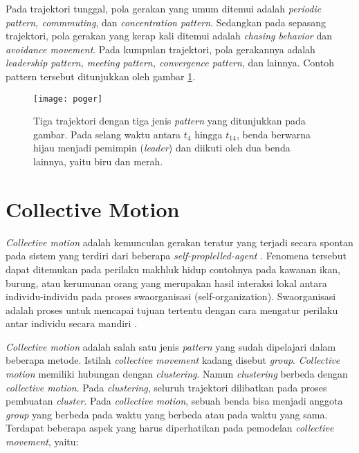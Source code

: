 \par Pada trajektori tunggal, pola gerakan yang umum ditemui adalah \textit{periodic pattern, commmuting}, dan \textit{concentration pattern}. Sedangkan pada sepasang trajektori, pola gerakan yang kerap kali ditemui adalah \textit{chasing behavior} dan \textit{avoidance movement}. Pada kumpulan trajektori, pola gerakannya adalah \textit{leadership pattern, meeting pattern, convergence pattern}, dan lainnya. Contoh pattern tersebut ditunjukkan oleh gambar  \ref{fig:poger}.
\begin{figure}[h]
	\centering  
	\texttt{[image: poger]}  
	\caption{Tiga trajektori dengan tiga jenis \textit{pattern} yang ditunjukkan pada gambar. Pada selang waktu antara $t_{4}$ hingga $t_{14}$, benda berwarna hijau menjadi pemimpin (\textit{leader}) dan diikuti oleh dua benda lainnya, yaitu biru dan merah.} 
	\label{fig:poger} 
\end{figure}

\section{Collective Motion}
\label{sec:collmotion} 
 
\par \textit{Collective motion} adalah kemunculan gerakan teratur yang terjadi secara spontan pada sistem yang terdiri dari beberapa \textit{self-proplelled-agent} \cite{palacci:13:living}. Fenomena tersebut dapat ditemukan pada perilaku makhluk hidup contohnya pada kawanan ikan, burung, atau kerumunan orang yang merupakan hasil interaksi lokal antara individu-individu pada proses swaorganisasi (self-organization). Swaorganisasi adalah proses untuk mencapai tujuan tertentu dengan cara mengatur perilaku antar individu secara mandiri \cite{wilshaw:06}.

\par \textit{Collective motion} adalah salah satu jenis \textit{pattern} yang sudah dipelajari dalam beberapa metode. Istilah \textit{collective movement} kadang disebut \textit{group}. \textit{Collective motion} memiliki hubungan dengan \textit{clustering}. Namun \textit{clustering} berbeda dengan \textit{collective motion}. Pada \textit{clustering}, seluruh trajektori dilibatkan pada proses pembuatan \textit{cluster}. Pada \textit{collective motion}, sebuah benda bisa menjadi anggota \textit{group} yang berbeda pada waktu yang berbeda atau pada waktu yang sama. Terdapat beberapa aspek yang harus diperhatikan pada pemodelan \textit{collective movement}, yaitu:

